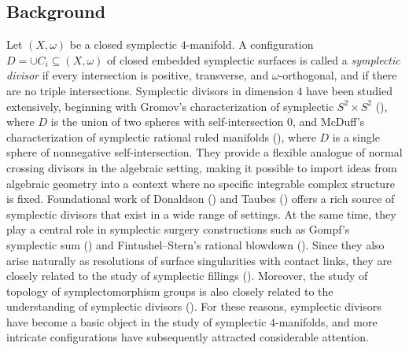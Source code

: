 \documentclass[11pt]{article}
\theoremstyle{definition}
\theoremstyle{remark}
\begin{document}
\subsection{Background} 
Let $(X,\omega)$ be a closed symplectic $4$-manifold. A configuration $D=\cup C_i\subseteq (X,\omega)$ of closed embedded symplectic surfaces is called a \emph{symplectic divisor} if every intersection is positive, transverse, and $\omega$-orthogonal, and if there are no triple intersections. Symplectic divisors in dimension $4$ have been studied extensively, beginning with Gromov's characterization of symplectic $S^2\times S^2$ (\cite{Gromov}), where $D$ is the union of two spheres with self-intersection $0$, and McDuff's characterization of symplectic rational ruled manifolds (\cite{Mcduffrationalruled}), where $D$ is a single sphere of nonnegative self-intersection. They provide a flexible analogue of normal crossing divisors in the algebraic setting, making it possible to import ideas from algebraic geometry into a context where no specific integrable complex structure is fixed. Foundational work of Donaldson (\cite{Donaldson}) and Taubes (\cite{Taubes}) offers a rich source of symplectic divisors that exist in a wide range of settings. At the same time, they play a central role in symplectic surgery constructions such as Gompf's symplectic sum (\cite{Gompf}) and Fintushel--Stern's rational blowdown (\cite{FintushelStern}). Since they also arise naturally as resolutions of surface singularities with contact links, they are closely related to the study of symplectic fillings (\cite{Lisca,OhtaOno,GayStipsicz}). Moreover, the study of topology of symplectomorphism groups is also closely related to the understanding of symplectic divisors (\cite{Abreu,AbreuMcDuff}). For these reasons, symplectic divisors have become a basic object in the study of symplectic $4$-manifolds, and more intricate configurations have subsequently attracted considerable attention.
\end{document}
